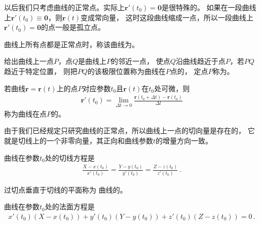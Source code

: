 以后我们只考虑曲线的正常点。实际上$\bm r'(t_0)=\bm 0$是很特殊的。
如果在一段曲线上$\bm r'(t_0)\equiv\bm 0$，则$\bm r(t)$变成常向量，
这时这段曲线缩成一点，所以一段曲线上$\bm r'(t_0)=\bm 0$的点一般是孤立点。
\begin{definition}
    曲线上所有点都是正常点时，称该曲线为。
\end{definition}

\begin{definition}
    给出曲线上一点$P$，点$Q$是曲线上$P$的邻近一点，
    使点$Q$沿曲线趋近于点$P$，若$PQ$趋近于特定位置，
    则把$PQ$的该极限位置称为曲线在$P$点的，
    定点$P$称为。
\end{definition}

\begin{definition}
    若曲线$\bm r=\bm r(t)$上的点$P$对应参数$t_0$且$\bm r(t)$在$t_0$处可微，则
    \begin{align}\label{eq:03ex01.5}
        \bm r'(t_0)=\lim\limits_{\Delta t\rightarrow0}{\frac{\bm r(t_0+\Delta t)-\bm r(t_0)}{\Delta t}}
    \end{align}
    称为曲线在点$P$的。
\end{definition}

由于我们已经规定只研究曲线的正常点，所以曲线上一点的切向量是存在的，
它就是切线上的一个非零向量，其正向和曲线参数$t$的增量方向一致。

\begin{corollary}
    曲线在参数$t_0$处的切线方程是
    \begin{align}\label{eq:03ex01.6}
        \frac{X-x(t_0)}{x'(t_0)}=\frac{Y-y(t_0)}{y'(t_0)}=\frac{Z-z(t_0)}{z'(t_0)}\, .
    \end{align}
\end{corollary}

\begin{definition}
    过切点垂直于切线的平面称为
    曲线的。
\end{definition}

\begin{corollary}
    曲线在参数$t_0$处的法面方程是
    \begin{align}\label{eq:03ex01.7}
        x'(t_0)(X-x(t_0))+y'(t_0)(Y-y(t_0))+z'(t_0)(Z-z(t_0))=0\, .
    \end{align}
\end{corollary}

